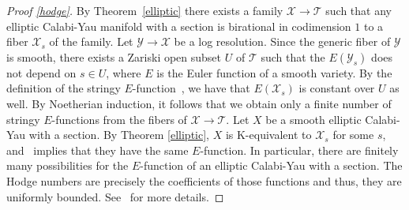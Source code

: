 \documentclass{amsart}[12pt,a4paper]
\theoremstyle{definition}
\begin{document}
\begin{proof}[Proof \ref{hodge}]
By Theorem~\ref{elliptic} there exists a family $\mathcal{X}\rightarrow \mathcal{T}$ such that any elliptic Calabi-Yau manifold with a section is birational in codimension $1$ to a fiber $\mathcal{X}_s$ of the family. 
Let $\mathcal{Y}\rightarrow \mathcal{X}$ be a log resolution. 
Since the generic fiber of $\mathcal{Y}$ is smooth, there exists a Zariski open subset $U$ of $\mathcal{T}$ such that the $E(\mathcal{Y}_s)$ does not depend on $s\in U$, where $E$ is the Euler function of a smooth variety. 
By the definition of the stringy $E$-function~\cite{Bat99}, we have that $E(\mathcal{X}_s)$ is constant over $U$ as well. 
By Noetherian induction, it follows that we obtain only a finite number of stringy $E$-functions from the fibers of $\mathcal{X}\rightarrow \mathcal{T}$. 
\newline
Let $X$ be a smooth elliptic Calabi-Yau with a section. By Theorem \ref{elliptic}, $X$ is K-equivalent to $\mathcal{X}_s$ for some $s$, and~\cite[Theorem~2.7]{Vey01} implies that they have the same $E$-function. 
In particular, there are finitely many possibilities for the $E$-function of an elliptic Calabi-Yau with a section. 
The Hodge numbers are precisely the coefficients of those functions and thus, they are uniformly bounded. 
See~\cite{Vey01} for more details. 
\end{proof}

\end{document}
